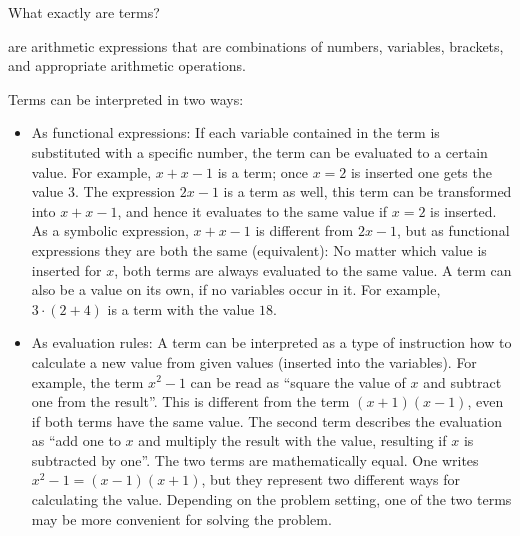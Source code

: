 \begin{MIntro}
What exactly are terms? 
\begin{MInfo}
 are arithmetic expressions that are combinations of numbers, variables, 
brackets, and appropriate arithmetic operations.
\end{MInfo}

Terms can be interpreted in two ways:
\begin{itemize}
\item{As functional expressions: If each variable contained in the term is substituted with a specific number, 
the term can be evaluated to a certain value. For example, $x+x-1$ is a term; once $x=2$ is inserted one gets the value $3$. The
expression $2x-1$ is a term as well, this term can be transformed into $x+x-1$, and hence it evaluates to the same value if $x=2$ is 
inserted. As a symbolic expression, $x+x-1$ is different from $2x-1$, but as functional expressions they are both the same (equivalent): 
No matter which value is inserted for $x$, both terms are always evaluated to the same value. A term can also be a value on its own, 
if no variables occur in it. For example, $3\cdot (2+4)$ is a term with the value $18$.}
\item{As evaluation rules: A term can be interpreted as a type of instruction how to calculate a new value from given values 
(inserted into the variables). For example, the term $x^2-1$ can be read as 
``square the value of $x$ and subtract one from the result''. This is different from
the term $(x+1)(x-1)$, even if both terms have the same value. The second term describes the evaluation as  
``add one to $x$ and multiply the result with the value, resulting if $x$ is subtracted by one''. The two terms are 
mathematically equal. One writes $x^2-1=(x-1)(x+1)$, but they represent two different ways for calculating the value. Depending on 
the problem setting, one of the two terms may be more convenient for solving the problem.}
\end{itemize}

\end{MIntro}


